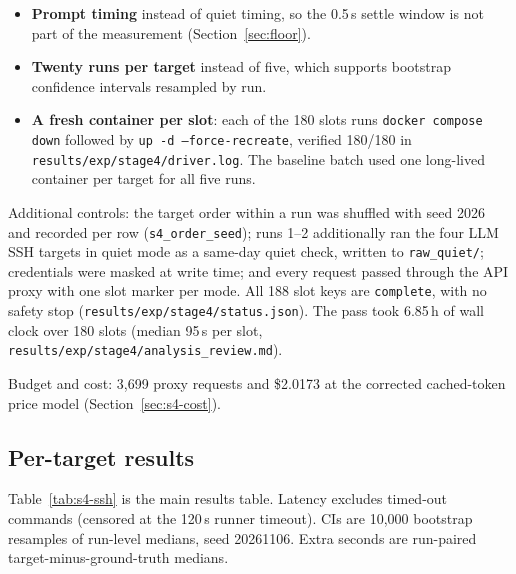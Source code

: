 \documentclass[a4paper,11pt]{article}
\begin{document}
\begin{itemize}[leftmargin=*]
\item \textbf{Prompt timing} instead of quiet timing, so the 0.5\,s settle
  window is not part of the measurement (Section~\ref{sec:floor}).
\item \textbf{Twenty runs per target} instead of five, which supports
  bootstrap confidence intervals resampled by run.
\item \textbf{A fresh container per slot}: each of the 180 slots runs
  \texttt{docker compose down} followed by \texttt{up -d --force-recreate},
  verified 180/180 in \texttt{results/exp/stage4/driver.log}. The baseline
  batch used one long-lived container per target for all five runs.
\end{itemize}

Additional controls: the target order within a run was shuffled with seed
2026 and recorded per row (\texttt{s4\_order\_seed}); runs 1--2 additionally
ran the four LLM SSH targets in quiet mode as a same-day quiet check, written
to \texttt{raw\_quiet/}; credentials were masked at write time; and every
request passed through the API proxy with one slot marker per mode. All 188
slot keys are \texttt{complete}, with no safety stop
(\texttt{results/exp/stage4/status.json}). The pass took 6.85\,h of wall clock
over 180 slots (median 95\,s per slot,
\texttt{results/exp/stage4/analysis\_review.md}).

Budget and cost: 3,699 proxy requests and \$2.0173 at the corrected
cached-token price model (Section~\ref{sec:s4-cost}).

\subsection{Per-target results}

Table~\ref{tab:s4-ssh} is the main results table. Latency excludes timed-out
commands (censored at the 120\,s runner timeout). CIs are 10,000 bootstrap
resamples of run-level medians, seed 20261106. Extra seconds are run-paired
target-minus-ground-truth medians.
\end{document}
